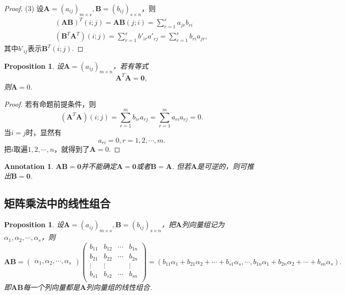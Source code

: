 \documentclass{article}
\newtheorem{proposition}[theorem]{Proposition}
\newtheorem{annotation}[theorem]{Annotation}
\newcommand{\mbf}[1]{\bm{#1}}
\begin{document}
\begin{proof}
(3) 设$\mbf{A}=(a_{ij})_{m\times s},\mbf{B}=(b_{ij})_{s\times n}$，则
$$
\begin{array}{ll}
(\mbf{A}\mbf{B})^T(i;j) = \mbf{A}\mbf{B}(j;i) = \sum\limits_{r = 1}^s a_{jr}b_{ri} \\
(\mbf{B}^T\mbf{A}^T)(i;j) = \sum\limits_{r = 1}^s b'_{ir}a'_{rj} = \sum\limits_{r = 1}^s b_{ri}a_{jr},
\end{array}
$$
其中$b'_{ij}$表示$\mbf{B}^T(i;j)$.
\end{proof}

\begin{proposition}
\rm 设$\mbf{A}=(a_{ij})_{m \times n}$，若有等式
$$
\mbf{A}^T\mbf{A} = \mbf{0},
$$
则$\mbf{A}={0}$.
\end{proposition}

\begin{proof}
若有命题前提条件，则
$$
(\mbf{A}^T\mbf{A})(i;j) = \sum\limits_{r=1}^m b_{ir}a_{rj} = \sum\limits_{r=1}^m a_{ri}a_{rj}=0. 
$$
当$i=j$时，显然有
$$
a_{ri} = 0, r=1,2,\cdots,m.
$$
把$i$取遍$1,2,\cdots,n$，就得到了$\mbf{A} = 0$.
\end{proof}

\begin{annotation}
\rm $\mbf{AB}=\mbf{0}$并不能确定$\mbf{A}=\mbf{0}$或者$\mbf{B}=\mbf{A}$. 但若$\mbf{A}$是可逆的，则可推出$\mbf{B}=\mbf{0}$. 
\end{annotation}

\subsection{矩阵乘法中的线性组合}

\begin{proposition}\label{combination-in-matrix-multiplication: clomun-vector}
\rm 设$\mbf{A}=(a_{ij})_{m \times s},\mbf{B}=(b_{ij})_{s \times n}$，把$\mbf{A}$列向量组记为$\alpha_1,\alpha_2,\cdots,\alpha_s$，则
$$
\mbf{A}\mbf{B} = \begin{pmatrix}
\alpha_1,\alpha_2,\cdots,\alpha_s
\end{pmatrix}\begin{pmatrix}
b_{11} & b_{12} & \cdots & b_{1n} \\
b_{21} & b_{22} & \cdots & b_{2n} \\
\vdots & \vdots & 		 & \vdots \\
b_{s1} & b_{s2} & \cdots & b_{sn} \\
\end{pmatrix} =
(b_{11}\alpha_1 + b_{21}\alpha_2 + \cdots + b_{s1}\alpha_s,\cdots, b_{1n}\alpha_1 + b_{2n}\alpha_2 + \cdots + b_{sn}\alpha_s).
$$
即$\mbf{A}\mbf{B}$每一个列向量都是$\mbf{A}$列向量组的线性组合.
\end{proposition}
\end{document}
